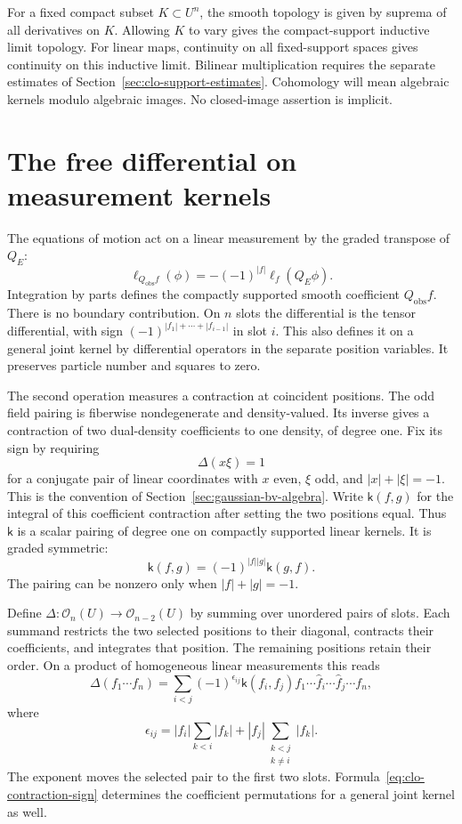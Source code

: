 For a fixed compact subset $K\subset U^n$, the smooth topology is
given by suprema of all derivatives on $K$.
Allowing $K$ to vary gives the compact-support inductive limit topology.
For linear maps, continuity on all fixed-support spaces gives continuity
on this inductive limit. Bilinear multiplication requires the separate
estimates of Section~\ref{sec:clo-support-estimates}.
Cohomology will mean algebraic kernels modulo algebraic images.
No closed-image assertion is implicit.

\section{The free differential on measurement kernels}
\label{sec:clo-free-differential}

The equations of motion act on a linear measurement by the graded
transpose of $Q_E$:
\[
 \ell_{Q_{\mathrm{obs}}f}(\phi)
 =-(-1)^{|f|}\ell_f(Q_E\phi).
\]
Integration by parts defines the compactly supported smooth coefficient
$Q_{\mathrm{obs}}f$. There is no boundary contribution.
On $n$ slots the differential is the tensor differential, with sign
$(-1)^{|f_1|+\cdots+|f_{i-1}|}$ in slot $i$.
This also defines it on a general joint kernel by differential operators
in the separate position variables. It preserves particle number and
squares to zero.

The second operation measures a contraction at coincident positions.
The odd field pairing is fiberwise nondegenerate and density-valued.
Its inverse gives a contraction of two dual-density coefficients to one
density, of degree one. Fix its sign by requiring
\[
 \Delta(x\xi)=1
\]
for a conjugate pair of linear coordinates with $x$ even,
$\xi$ odd, and $|x|+|\xi|=-1$.
This is the convention of Section~\ref{sec:gaussian-bv-algebra}.
Write $\mathsf k(f,g)$ for the integral of this coefficient contraction
after setting the two positions equal. Thus $\mathsf k$ is a scalar
pairing of degree one on compactly supported linear kernels.
It is graded symmetric:
\[
 \mathsf k(f,g)=(-1)^{|f||g|}\mathsf k(g,f).
\]
The pairing can be nonzero only when $|f|+|g|=-1$.

Define $\Delta:\mathscr O_n(U)\to\mathscr O_{n-2}(U)$ by summing
over unordered pairs of slots. Each summand restricts the two selected
positions to their diagonal, contracts their coefficients, and integrates
that position. The remaining positions retain their order.
On a product of homogeneous linear measurements this reads
\begin{equation}\label{eq:clo-contraction-sign}
 \Delta(f_1\cdots f_n)=
 \sum_{i<j}(-1)^{\epsilon_{ij}}\mathsf k(f_i,f_j)
 f_1\cdots\widehat f_i\cdots\widehat f_j\cdots f_n,
\end{equation}
where
\[
 \epsilon_{ij}=
 |f_i|\sum_{k<i}|f_k|
 +|f_j|\sum_{\substack{k<j\\k\ne i}}|f_k|.
\]
The exponent moves the selected pair to the first two slots.
Formula~\eqref{eq:clo-contraction-sign} determines the coefficient
permutations for a general joint kernel as well.

